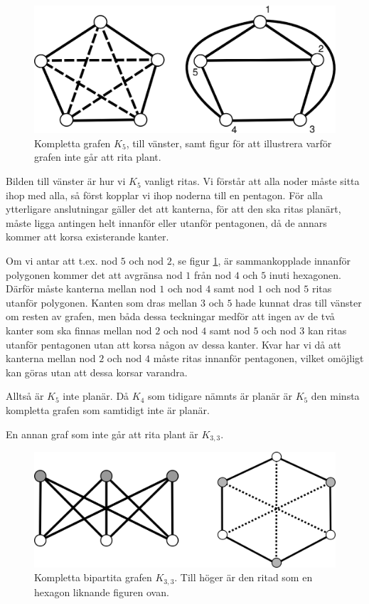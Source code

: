 \documentclass[a4paper,11pt]{article}
\begin{document}
\begin{figure}[!ht]
	\begin{center}
		\includegraphics{fig5}
		\caption{Kompletta grafen $K_5$, till vänster, samt figur för att illustrera varför grafen inte går att rita plant.}
		\label{fig5}
	\end{center}
\end{figure}
\FloatBarrier

Bilden till vänster är hur vi $K_5$ vanligt ritas.
Vi förstår att alla noder måste sitta ihop med alla, så först kopplar vi ihop noderna till en pentagon.
För alla ytterligare anslutningar gäller det att kanterna, för att den ska ritas planärt, måste ligga antingen helt innanför eller utanför pentagonen, då de annars kommer att korsa existerande kanter.

Om vi antar att t.ex. nod $5$ och nod $2$, se figur \ref{fig5}, är sammankopplade innanför polygonen kommer det att avgränsa nod $1$ från nod $4$ och $5$ inuti hexagonen.
Därför måste kanterna mellan nod $1$ och nod $4$ samt nod $1$ och nod $5$ ritas utanför polygonen.
Kanten som dras mellan $3$ och $5$ hade kunnat dras till vänster om resten av grafen, men båda dessa teckningar medför att ingen av de två kanter som ska finnas mellan nod $2$ och nod $4$ samt nod $5$ och nod $3$ kan ritas utanför pentagonen utan att korsa någon av dessa kanter.
Kvar har vi då att kanterna mellan nod $2$ och nod $4$ måste ritas innanför pentagonen, vilket omöjligt kan göras utan att dessa korsar varandra.

Alltså är $K_5$ inte planär. Då $K_4$ som tidigare nämnts är planär är $K_5$ den minsta kompletta grafen som samtidigt inte är planär.

En annan graf som inte går att rita plant är $K_{3,3}$.

\begin{figure}[!ht]
	\begin{center}
		\includegraphics{fig6}
		\caption{Kompletta bipartita grafen $K_{3,3}$. Till höger är den ritad som en hexagon liknande figuren ovan.}
		\label{fig6}
	\end{center}
\end{figure}
\FloatBarrier
\end{document}
